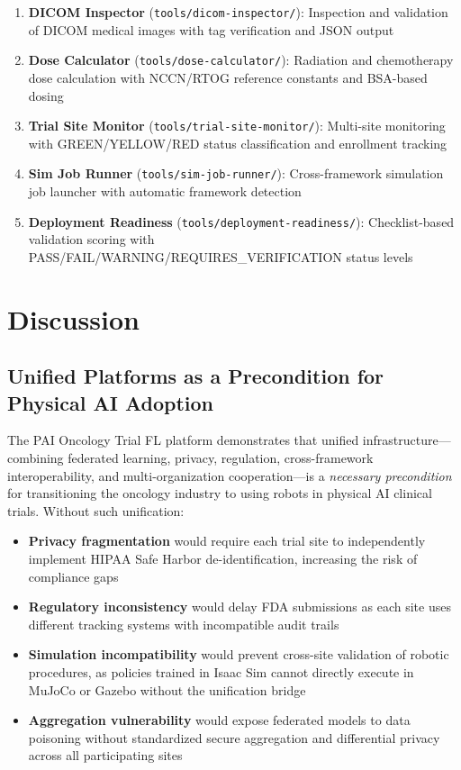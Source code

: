 \documentclass[10pt]{article}
\begin{document}
\begin{enumerate}
  \item \textbf{DICOM Inspector} (\texttt{tools/dicom-inspector/}): Inspection and validation of DICOM medical images with tag verification and JSON output
  \item \textbf{Dose Calculator} (\texttt{tools/dose-calculator/}): Radiation and chemotherapy dose calculation with NCCN/RTOG reference constants and BSA-based dosing
  \item \textbf{Trial Site Monitor} (\texttt{tools/trial-site-monitor/}): Multi-site monitoring with GREEN/YELLOW/RED status classification and enrollment tracking
  \item \textbf{Sim Job Runner} (\texttt{tools/sim-job-runner/}): Cross-framework simulation job launcher with automatic framework detection
  \item \textbf{Deployment Readiness} (\texttt{tools/deployment-readiness/}): Checklist-based validation scoring with PASS/FAIL/WARNING/REQUIRES\_VERIFICATION status levels
\end{enumerate}

\section{Discussion}
\label{sec:discussion}

\subsection{Unified Platforms as a Precondition for Physical AI Adoption}

The PAI Oncology Trial FL platform demonstrates that unified infrastructure---combining federated learning, privacy, regulation, cross-framework interoperability, and multi-organization cooperation---is a \emph{necessary precondition} for transitioning the oncology industry to using robots in physical AI clinical trials. Without such unification:
\begin{itemize}
  \item \textbf{Privacy fragmentation} would require each trial site to independently implement HIPAA Safe Harbor de-identification, increasing the risk of compliance gaps
  \item \textbf{Regulatory inconsistency} would delay FDA submissions as each site uses different tracking systems with incompatible audit trails
  \item \textbf{Simulation incompatibility} would prevent cross-site validation of robotic procedures, as policies trained in Isaac Sim cannot directly execute in MuJoCo or Gazebo without the unification bridge
  \item \textbf{Aggregation vulnerability} would expose federated models to data poisoning without standardized secure aggregation and differential privacy across all participating sites
\end{itemize}
\end{document}
